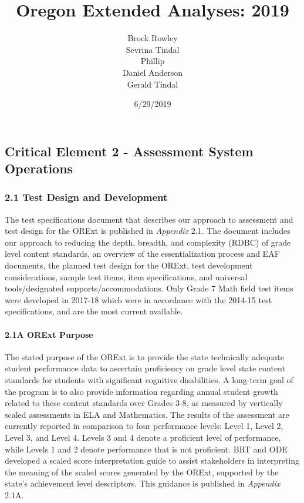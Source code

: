 \documentclass[]{article}
\title{Oregon Extended Analyses: 2019}
\author{Brock Rowley \\ Sevrina Tindal \\ Phillip \\ Daniel Anderson \\ Gerald Tindal}
\date{6/29/2019}
\let\oldparagraph\paragraph
\renewcommand{\paragraph}[1]{\oldparagraph{#1}\mbox{}}
\begin{document}
\maketitle

{
\setcounter{tocdepth}{5}
\tableofcontents
}
\hypertarget{critical-element-2---assessment-system-operations}{%
\subsection{Critical Element 2 - Assessment System
Operations}\label{critical-element-2---assessment-system-operations}}

\hypertarget{test-design-and-development}{%
\subsubsection{2.1 Test Design and
Development}\label{test-design-and-development}}

The test specifications document that describes our approach to
assessment and test design for the ORExt is published in \emph{Appendix}
2.1. The document includes our approach to reducing the depth, breadth,
and complexity (RDBC) of grade level content standards, an overview of
the essentialization process and EAF documents, the planned test design
for the ORExt, test development considerations, sample test items, item
specifications, and universal tools/designated supports/accommodations.
Only Grade 7 Math field test items were developed in 2017-18 which were
in accordance with the 2014-15 test specifications, and are the most
current available.

\hypertarget{a-orext-purpose}{%
\paragraph{2.1A ORExt Purpose}\label{a-orext-purpose}}

The stated purpose of the ORExt is to provide the state technically
adequate student performance data to ascertain proficiency on grade
level state content standards for students with significant cognitive
disabilities. A long-term goal of the program is to also provide
information regarding annual student growth related to these content
standards over Grades 3-8, as measured by vertically scaled assessments
in ELA and Mathematics. The results of the assessment are currently
reported in comparison to four performance levels: Level 1, Level 2,
Level 3, and Level 4. Levels 3 and 4 denote a proficient level of
performance, while Levels 1 and 2 denote performance that is not
proficient. BRT and ODE developed a scaled score interpretation guide to
assist stakeholders in interpreting the meaning of the scaled scores
generated by the ORExt, supported by the state's achievement level
descriptors. This guidance is published in \emph{Appendix} 2.1A.
\end{document}
